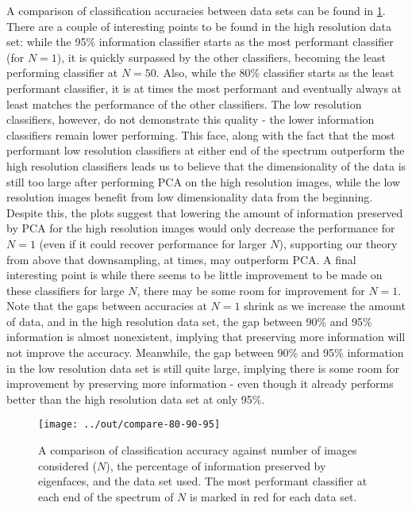 \documentclass[headings=optiontoheadandtoc,listof=totoc,parskip=full]{scrartcl}
\begin{document}
A comparison of classification accuracies between data sets can be found in \cref{fig:classification-accuracy}. There are a couple of interesting points to be found in the high resolution data set: while the 95\% information classifier starts as the most performant classifier (for $N = 1$), it is quickly surpassed by the other classifiers, becoming the least performing classifier at $N = 50$. Also, while the 80\% classifier starts as the least performant classifier, it is at times the most performant and eventually always at least matches the performance of the other classifiers. The low resolution classifiers, however, do not demonstrate this quality - the lower information classifiers remain lower performing. This face, along with the fact that the most performant low resolution classifiers at either end of the spectrum outperform the high resolution classifiers leads us to believe that the dimensionality of the data is still too large after performing PCA on the high resolution images, while the low resolution images benefit from low dimensionality data from the beginning. Despite this, the plots suggest that lowering the amount of information preserved by PCA for the high resolution images would only decrease the performance for $N = 1$ (even if it could recover performance for larger $N$), supporting our theory from above that downsampling, at times, may outperform PCA. A final interesting point is while there seems to be little improvement to be made on these classifiers for large $N$, there may be some room for improvement for $N = 1$. Note that the gaps between accuracies at $N = 1$ shrink as we increase the amount of data, and in the high resolution data set, the gap between 90\% and 95\% information is almost nonexistent, implying that preserving more information will not improve the accuracy. Meanwhile, the gap between 90\% and 95\% information in the low resolution data set is still quite large, implying there is some room for improvement by preserving more information - even though it already performs better than the high resolution data set at only 95\%.

\begin{figure}[H]
	\centering
	\texttt{[image: ../out/compare-80-90-95]}
	\caption{A comparison of classification accuracy against number of images considered ($N$), the percentage of information preserved by eigenfaces, and the data set used. The most performant classifier at each end of the spectrum of $N$ is marked in red for each data set.}
	\label{fig:classification-accuracy}
\end{figure}
\end{document}
